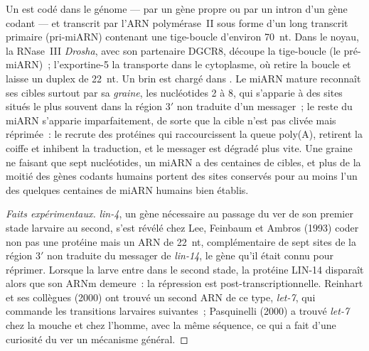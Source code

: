 \begin{definition}\label{def:b3:rna-regulation:mirna}
Un \emph{} est codé dans le génome --- par un gène propre ou
par un intron d'un gène codant --- et transcrit par l'ARN polymérase~II
sous forme d'un long transcrit primaire (pri-miARN) contenant une
tige-boucle d'environ \qty{70}{nt}. Dans le noyau, la RNase~III
\emph{Drosha}, avec son partenaire DGCR8, découpe la tige-boucle
(le pré-miARN)~; l'exportine-5 la transporte dans le cytoplasme, où
 retire la boucle et laisse un duplex de \qty{22}{nt}. Un brin est
chargé dans . Le miARN mature reconnaît ses cibles surtout par
sa \emph{graine}, les nucléotides 2 à 8, qui s'apparie à des sites
situés le plus souvent dans la région 3$'$ non traduite d'un messager~;
le reste du miARN s'apparie imparfaitement, de sorte que la cible n'est
pas clivée mais réprimée~: le  recrute des protéines qui
raccourcissent la queue poly(A), retirent la coiffe et inhibent la
traduction, et le messager est dégradé plus vite. Une graine ne faisant
que sept nucléotides, un miARN a des centaines de cibles, et plus de la
moitié des gènes codants humains portent des sites conservés pour au
moins l'un des quelques centaines de miARN humains bien établis.
\end{definition}

\begin{proof}[Faits expérimentaux]
\emph{lin-4}, un gène nécessaire au passage du ver de son premier stade
larvaire au second, s'est révélé chez Lee, Feinbaum et Ambros (1993)
coder non pas une protéine mais un ARN de \qty{22}{nt}, complémentaire
de sept sites de la région 3$'$ non traduite du messager de
\emph{lin-14}, le gène qu'il était connu pour réprimer. Lorsque la
larve entre dans le second stade, la protéine LIN-14 disparaît alors
que son ARNm demeure~: la répression est post-transcriptionnelle.
Reinhart et ses collègues (2000) ont trouvé un second ARN de ce type,
\emph{let-7}, qui commande les transitions larvaires suivantes~;
Pasquinelli (2000) a trouvé \emph{let-7} chez la mouche et chez
l'homme, avec la même séquence, ce qui a fait d'une curiosité du ver un
mécanisme général.
\end{proof}

